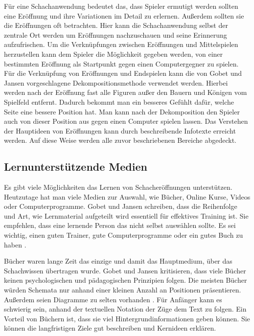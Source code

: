 Für eine Schachanwendung bedeutet das, dass Spieler ermutigt werden sollten eine Eröffnung und ihre Variationen im Detail zu erlernen. Außerdem sollten sie die Eröffnungen oft betrachten.
Hier kann die Schachanwendung selbst der zentrale Ort werden um Eröffnungen nachzuschauen und seine Erinnerung aufzufrischen. Um die Verknüpfungen zwischen Eröffnungen und Mittelspielen herzustellen kann dem Spieler die Möglichkeit gegeben werden, von einer bestimmten Eröffnung als Startpunkt gegen einen Computergegner zu spielen. Für die Verknüpfung von Eröffnungen und Endspielen kann die von Gobet und Jansen \cite{gobet_training_2006} vorgeschlagene Dekompositionsmethode verwendet werden. Hierbei werden nach der Eröffnung fast alle Figuren außer den Bauern und Königen vom Spielfeld entfernt. Dadurch bekommt man ein besseres Gefühlt dafür, welche Seite eine bessere Position hat. Man kann nach der Dekomposition den Spieler auch von dieser Position aus gegen einen Computer spielen lassen. Das Verstehen der Hauptideen von Eröffnungen kann durch beschreibende Infotexte erreicht werden. Auf diese Weise werden alle zuvor beschriebenen Bereiche abgedeckt. 

\subsection{Lernunterstützende Medien}
Es gibt viele Möglichkeiten das Lernen von Schacheröffnungen unterstützen. Heutzutage hat man viele Medien zur Auswahl, wie Bücher, Online Kurse, Videos oder Computerprogramme. Gobet und Jansen schreiben, dass die Reihenfolge und Art, wie Lernmaterial aufgeteilt wird essentiell für effektives Training ist. Sie empfehlen, dass eine lernende Person das nicht selbst auswählen sollte. Es sei wichtig, einen guten Trainer, gute Computerprogramme oder ein gutes Buch zu haben \cite{gobet_training_2006}.

Bücher waren lange Zeit das einzige und damit das Hauptmedium, über das Schachwissen übertragen wurde. Gobet und Jansen kritisieren, dass viele Bücher keinen psychologischen und pädagogischen Prinzipien folgen. Die meisten Bücher würden Schemata nur anhand einer kleinen Anzahl an Positionen präsentieren. Außerdem seien Diagramme zu selten vorhanden \cite{gobet_training_2006}. Für Anfänger kann es schwierig sein, anhand der textuellen Notation der Züge dem Text zu folgen. Ein Vorteil von Büchern ist, dass sie viel Hintergrundinformationen geben können. Sie können die langfristigen Ziele gut beschreiben und Kernideen erklären.

